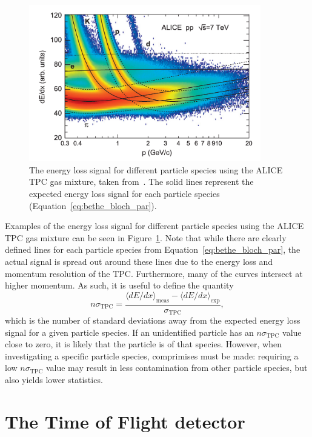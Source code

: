 \begin{figure}
    \centering
    \includegraphics[width=0.9\textwidth]{figures/experiment/tpc_pid_curves.png}
    \caption{The energy loss signal for different particle species using the ALICE TPC gas mixture, taken from~\cite{BetheBlochALEPH}. The solid lines represent the expected energy loss signal for each particle species (Equation~\ref{eq:bethe_bloch_par}).}
    \label{fig:tpc_pid_curves}
\end{figure}

Examples of the energy loss signal for different particle species using the ALICE TPC gas mixture can be seen in Figure~\ref{fig:tpc_pid_curves}. Note that while there are clearly defined lines for each particle species from Equation~\ref{eq:bethe_bloch_par}, the actual signal is spread out around these lines due to the energy loss and momentum resolution of the TPC. Furthermore, many of the curves intersect at higher momentum. As such, it is useful to define the quantity 
\begin{equation}
n\sigma_{\text{TPC}} = \frac{\langle dE/dx \rangle_{\text{meas}} - \langle dE/dx \rangle_{\text{exp}}}{\sigma_{\text{TPC}}},
\end{equation}
which is the number of standard deviations away from the expected energy loss signal for a given particle species. If an unidentified particle has an $n\sigma_{\text{TPC}}$ value close to zero, it is likely that the particle is of that species. However, when investigating a specific particle species, comprimises must be made: requiring a low $n\sigma_{\text{TPC}}$ value may result in less contamination from other particle species, but also yields lower statistics.

\section{The Time of Flight detector}

